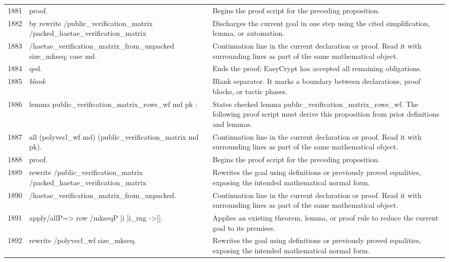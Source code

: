 \documentclass[10pt]{article}
\begin{document}
\begin{longtable}{r L{0.53\textwidth} L{0.37\textwidth}}
1881 & {\ttfamily\scriptsize proof.} & Begins the proof script for the preceding proposition. \\
1882 & {\ttfamily\scriptsize by rewrite /public\_verification\_matrix /packed\_haetae\_verification\_matrix} & Discharges the current goal in one step using the cited simplification, lemma, or automation. \\
1883 & {\ttfamily\scriptsize            /haetae\_verification\_matrix\_from\_unpacked size\_mkseq; case md.} & Continuation line in the current declaration or proof.  Read it with surrounding lines as part of the same mathematical object. \\
1884 & {\ttfamily\scriptsize qed.} & Ends the proof; EasyCrypt has accepted all remaining obligations. \\
1885 & {\ttfamily\scriptsize \emph{blank}} & Blank separator.  It marks a boundary between declarations, proof blocks, or tactic phases. \\
1886 & {\ttfamily\scriptsize lemma public\_verification\_matrix\_rows\_wf md pk :} & States checked lemma public\_verification\_matrix\_rows\_wf.  The following proof script must derive this proposition from prior definitions and lemmas. \\
1887 & {\ttfamily\scriptsize   all (polyvecl\_wf md) (public\_verification\_matrix md pk).} & Continuation line in the current declaration or proof.  Read it with surrounding lines as part of the same mathematical object. \\
1888 & {\ttfamily\scriptsize proof.} & Begins the proof script for the preceding proposition. \\
1889 & {\ttfamily\scriptsize rewrite /public\_verification\_matrix /packed\_haetae\_verification\_matrix} & Rewrites the goal using definitions or previously proved equalities, exposing the intended mathematical normal form. \\
1890 & {\ttfamily\scriptsize         /haetae\_verification\_matrix\_from\_unpacked.} & Continuation line in the current declaration or proof.  Read it with surrounding lines as part of the same mathematical object. \\
1891 & {\ttfamily\scriptsize apply/allP=> row /mkseqP [i [i\_rng ->]].} & Applies an existing theorem, lemma, or proof rule to reduce the current goal to its premises. \\
1892 & {\ttfamily\scriptsize rewrite /polyvecl\_wf size\_mkseq.} & Rewrites the goal using definitions or previously proved equalities, exposing the intended mathematical normal form. \\

\end{longtable}
\end{document}

